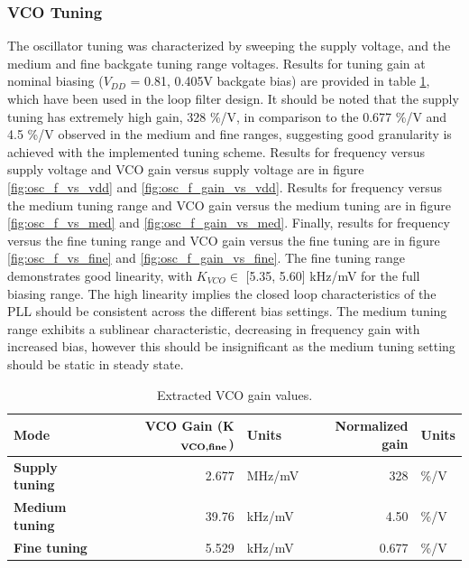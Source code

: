 	\FloatBarrier

	\subsubsection{VCO Tuning}\FloatBarrier
	The oscillator tuning was characterized by sweeping the supply voltage, and the medium and fine backgate tuning range voltages. Results for tuning gain at nominal biasing ($V_{DD}$ = 0.81, 0.405V backgate bias) are provided in table \ref{tab:vco_gains}, which have been used in the loop filter design. It should be noted that the supply tuning has extremely high gain, 328 \%/V, in comparison to the 0.677 \%/V and 4.5 \%/V observed in the medium and fine ranges, suggesting good granularity is achieved with the implemented tuning scheme. Results for frequency versus supply voltage and VCO gain versus supply voltage are in figure \ref{fig:osc_f_vs_vdd} and \ref{fig:osc_f_gain_vs_vdd}. Results for frequency versus the medium tuning range and VCO gain versus the medium tuning  are in figure \ref{fig:osc_f_vs_med} and \ref{fig:osc_f_gain_vs_med}. Finally, results for frequency versus the fine tuning range and VCO gain versus the fine tuning  are in figure \ref{fig:osc_f_vs_fine} and \ref{fig:osc_f_gain_vs_fine}. The fine tuning range demonstrates good linearity, with $K_{VCO} \in$ [5.35, 5.60] kHz/mV for the full biasing range. The high linearity implies the closed loop characteristics of the PLL should be consistent across the different bias settings. The medium tuning range exhibits a sublinear characteristic, decreasing in frequency gain with increased bias, however this should be insignificant as the medium tuning setting should be static in steady state.
		\begin{table}[h!]
			\centering
			\def\arraystretch{1.5}		
			\setlength\arrayrulewidth{0.75pt}
			\setlength{\tabcolsep}{1em} %
			\begin{tabular}{|l|r|l|r|l|}
				\hline 
				\rule[-1ex]{0pt}{2.5ex} \cellcolor{gray!40}\textbf{Mode} & \cellcolor{gray!40}\textbf{VCO Gain (K$_\textnormal{\textbf{VCO,fine}}$)}  & \cellcolor{gray!40}\textbf{Units} & \cellcolor{gray!40}\textbf{Normalized gain}& \cellcolor{gray!40}\textbf{Units}\\ 
				\hline 
				\rule[-1ex]{0pt}{2.5ex} \textbf{Supply tuning}  & 2.677 & MHz/mV & 328 &\%/V\\
				\hline 
				\rule[-1ex]{0pt}{2.5ex} \textbf{Medium tuning}  & 39.76 & kHz/mV  & 4.50 &\%/V\\
				\hline 
				\rule[-1ex]{0pt}{2.5ex} \textbf{Fine tuning}  & 5.529 & kHz/mV & 0.677 & \%/V\\
				\hline 
			\end{tabular} 
			\caption{Extracted VCO gain values.}
			\label{tab:vco_gains}
		\end{table} 

